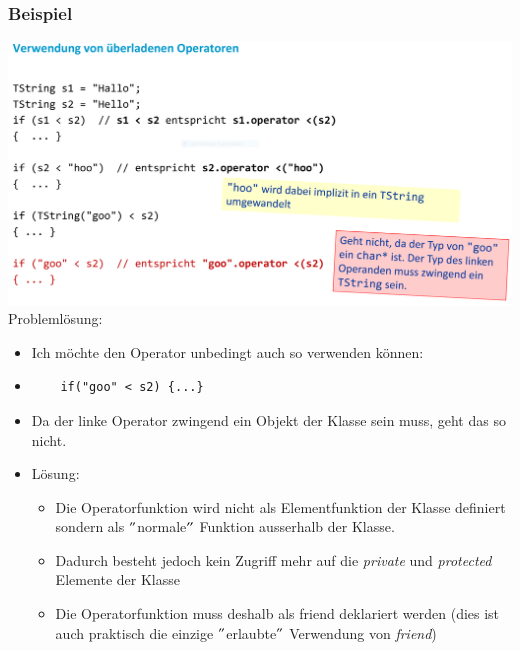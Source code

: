 \subsubsection{Beispiel}
\includegraphics[width=\linewidth]{images/verwendung.png}
Problemlösung:
\begin{itemize}
	\item Ich möchte den Operator unbedingt auch so verwenden können:
	\item[\-]\vspace{-\baselineskip}\begin{minipage}{0.4\linewidth}
	\begin{lstlisting}
	if("goo" < s2) {...}
	\end{lstlisting}
	\end{minipage}
	\item Da der linke Operator zwingend ein Objekt der Klasse sein muss, geht das so nicht.
	\item Lösung:
	\begin{itemize}
		\item Die Operatorfunktion wird nicht als Elementfunktion der Klasse definiert sondern als $"$normale$"$ Funktion ausserhalb der Klasse.
		\item Dadurch besteht jedoch kein Zugriff mehr auf die \emph{private} und \emph{protected} Elemente der Klasse
		\item Die Operatorfunktion muss deshalb als friend deklariert werden (dies ist auch praktisch die einzige $"$erlaubte$"$ Verwendung von \emph{friend})
	\end{itemize}
\end{itemize}
\vfill
\pagebreak\newpage

